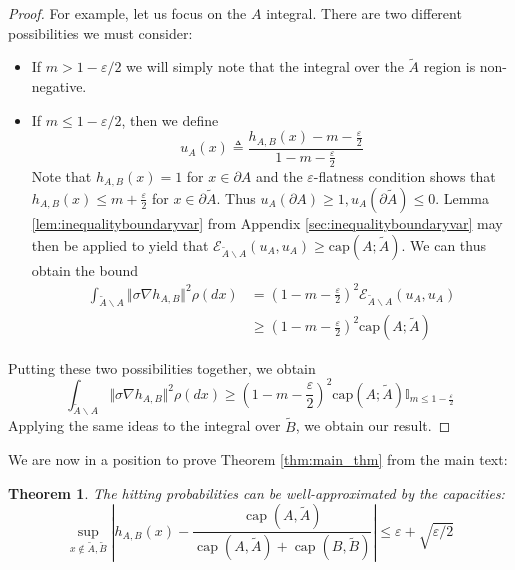 \documentclass[english, aip, jcp, priprint, graphicx,floatfix]{revtex4-1}
\newtheorem{theorem}{Theorem}
\theoremstyle{plain}
\theoremstyle{definition}
\theoremstyle{plain}
\newcommand{\indicatorf}[1]{\mathbb{I}_{#1}}
\newcommand{\capac}[2]{\mathrm{cap}\left(#1;#2\right)}
\begin{document}
\begin{proof}
For example, let us focus on the $A$ integral.  There are two different possibilities we must consider:
\begin{itemize}
\item If $m>1-\varepsilon/2$ we will simply note that the integral over the $\tilde A$ region is non-negative.  
\item If $m\leq 1-\varepsilon/2$, then we define
    \[
    u_A (x) \triangleq \frac{h_{A,B} (x) - m - \frac{\varepsilon}{2}}{1 - m - \frac{\varepsilon}{2}}
    \]
    Note that  $h_{A,B}(x)=1$ for $x \in \partial A$ and the $\varepsilon$-flatness condition shows that $h_{A,B}(x) \leq m + \frac {\varepsilon}{2}$ for $x \in \partial \tilde A$.  Thus $u_A(\partial A)\geq1,u_A(\partial \tilde A)\leq 0$.  Lemma \ref{lem:inequalityboundaryvar} from Appendix \ref{sec:inequalityboundaryvar} may then be applied to yield that $\mathscr{E}_{\tilde A \backslash A}(u_A,u_A) \geq \capac{A}{\tilde A}$.  We can thus obtain the bound
    \begin{align*}
    \int_{\tilde A \backslash A} \Vert \sigma \nabla h_{A,B}\Vert^2 \rho(dx) 
	 &= \left(1 - m - \frac{\varepsilon}{2}\right)^2 \mathscr{E}_{\tilde{A} \backslash A}(u_A,u_A)\\
         &\geq \left(1 - m - \frac{\varepsilon}{2}\right)^2 \capac{A}{\tilde A}
    \end{align*}
\end{itemize}
Putting these two possibilities together, we obtain
\[
\int_{\tilde A \backslash A} \Vert \sigma \nabla h_{A,B}\Vert^2 \rho(dx) \geq \left(1 - m - \frac{\varepsilon}{2}\right)^2 \capac{A}{\tilde A}\indicatorf{m\leq 1-\frac{\varepsilon}{2}}
\]
Applying the same ideas to the integral over $\tilde B$, we obtain our result.
\end{proof}


We are now in a position to prove Theorem \ref{thm:main_thm} from the main text:

\begingroup
\def\thetheorem{\ref{thm:main_thm}}
\begin{theorem}  The hitting probabilities can be well-approximated by the capacities:
\[ \sup_{x \notin \tilde A,\tilde B} \left| h_{A,B} (x) - \frac{\ensuremath{\operatorname{cap}} (A,
\tilde{A})}{\ensuremath{\operatorname{cap}} (A, \tilde{A})
+\ensuremath{\operatorname{cap}} (B, \tilde{B})} \right| \leqslant \varepsilon + \sqrt{\varepsilon/2} \]
\end{theorem}
\addtocounter{theorem}{-1}
\endgroup
\end{document}
